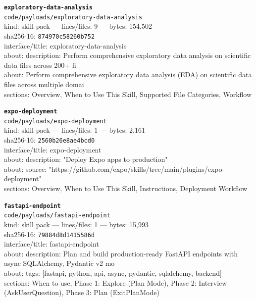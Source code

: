 \noindent\textbf{\texttt{exploratory-data-analysis}}\\
\texttt{code/payloads/exploratory-data-analysis}\\
kind: skill pack --- lines/files: 9 --- bytes: 154,502\\
sha256-16: \texttt{874970c58260b752}\\
interface/title: exploratory-data-analysis\\
about: description: Perform comprehensive exploratory data analysis on scientific data files across 200+ fi\\
about: Perform comprehensive exploratory data analysis (EDA) on scientific data files across multiple domai\\
sections: Overview, When to Use This Skill, Supported File Categories, Workflow\\
\vspace*{6.0pt}

\noindent\textbf{\texttt{expo-deployment}}\\
\texttt{code/payloads/expo-deployment}\\
kind: skill pack --- lines/files: 1 --- bytes: 2,161\\
sha256-16: \texttt{2560b26e8ae4bcd0}\\
interface/title: expo-deployment\\
about: description: "Deploy Expo apps to production"\\
about: source: "https://github.com/expo/skills/tree/main/plugins/expo-deployment"\\
sections: Overview, When to Use This Skill, Instructions, Deployment Workflow\\
\vspace*{6.0pt}

\noindent\textbf{\texttt{fastapi-endpoint}}\\
\texttt{code/payloads/fastapi-endpoint}\\
kind: skill pack --- lines/files: 1 --- bytes: 15,993\\
sha256-16: \texttt{79884d8d1415586d}\\
interface/title: fastapi-endpoint\\
about: description: Plan and build production-ready FastAPI endpoints with async SQLAlchemy, Pydantic v2 mo\\
about: tags: [fastapi, python, api, async, pydantic, sqlalchemy, backend]\\
sections: When to use, Phase 1: Explore (Plan Mode), Phase 2: Interview (AskUserQuestion), Phase 3: Plan (ExitPlanMode)\\
\vspace*{6.0pt}
\newpage

